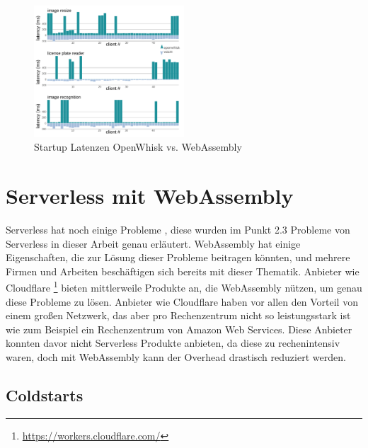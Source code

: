 \begin{figure}[t]
	\centering
	\includegraphics[width=0.5\textwidth]{images/RequestTimesReal.png}
	\caption{
		Startup Latenzen OpenWhisk vs. WebAssembly \autocite[]{Hall2019}
	}
	\label{figure:StartupLatSecond}
\end{figure}

\section{Serverless mit WebAssembly}
\label{section:Serverless mit WebAssembly}

Serverless hat noch einige Probleme \autocite[]{Baldini}, diese wurden im Punkt 2.3 Probleme von Serverless in dieser Arbeit genau erläutert. WebAssembly hat einige Eigenschaften, die zur Lösung dieser Probleme beitragen könnten, und mehrere Firmen und Arbeiten beschäftigen sich bereits mit dieser Thematik. Anbieter wie Cloudflare \footnote{\url{https://workers.cloudflare.com/}} bieten mittlerweile Produkte an, die WebAssembly nützen, um genau diese Probleme zu lösen. Anbieter wie Cloudflare haben vor allen den Vorteil von einem großen Netzwerk, das aber pro Rechenzentrum nicht so leistungsstark ist wie zum Beispiel ein Rechenzentrum von Amazon Web Services. Diese Anbieter konnten davor nicht Serverless Produkte anbieten, da diese zu rechenintensiv waren, doch mit WebAssembly kann der Overhead drastisch reduziert werden. \autocite[]{Hall2019}

\subsection{Coldstarts}


